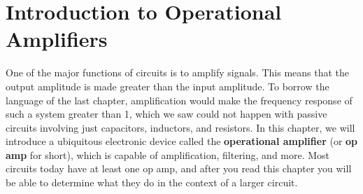 \chapter{Introduction to Operational Amplifiers}
One of the major functions of circuits is to amplify signals. This means that the output amplitude is made greater than the input amplitude. To borrow the language of the last chapter, amplification would make the frequency response of such a system greater than 1, which we saw could not happen with passive circuits involving just capacitors, inductors, and resistors. In this chapter, we will introduce a ubiquitous electronic device called the \textbf{operational amplifier} (or \textbf{op amp} for short), which is capable of amplification, filtering, and more. Most circuits today have at least one op amp, and after you read this chapter you will be able to determine what they do in the context of a larger circuit.
